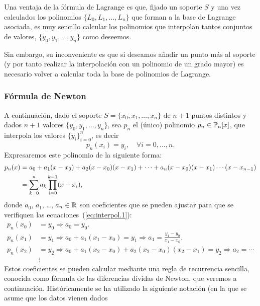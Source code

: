 \begin{remark}
  Una ventaja de la fórmula de Lagrange es que, fijado un soporte $S$
  y una vez calculados los polinomios $\{L_0,L_1,\dots, L_n\}$ que
  forman a la base de Lagrange asociada, es muy sencillo calcular los
  polinomios que interpolan tantos conjuntos de valores,
  $\{y_0,y_1,\dots,y_n\}$ como deseemos. 
  
  Sin embargo, su inconveniente es que si deseamos añadir un punto más
  al soporte (y por tanto realizar la interpolación con un polinomio
  de un grado mayor) es necesario volver a calcular toda la base de
  polinomios de Lagrange.
\end{remark}

\subsubsection{Fórmula de Newton}
\label{sec:formula-de-newton}
A continuación, dado el soporte $S=\{x_0,x_1,\dots,x_n\}$ de $n+1$ puntos
distintos y dados $n+1$ valores $\{y_0,y_1,\dots,y_n\}$, sea
$p_n$ el (único) polinomio $p_n \in \operatorname{{\mathbb P}}_n[x]$, que
interpola los valores $\{y_i\}_{i=0}^n$, es decir
\begin{equation}
p_n(x_i)=y_i, \quad \forall i=0,...,n.
\label{eq:interpol.1}
\end{equation}
Expresaremos este polinomio de la siguiente forma:
\begin{align}
  \notag
  p_n(x)&=a_0 + a_1 (x-x_0) + a_2(x-x_0)(x-x_1) + \cdots 
  + a_n(x-x_0)(x-x_1)\cdots(x-x_{n-1}) \\
  &=\sum_{k=0}^n a_k \prod_{i=0}^{k-1}(x-x_i),
\label{eq:pol.newton.dif-div}
\end{align}
donde $a_0$, $a_1$, \dots, $a_n\in\operatorname{{\mathbb R}}$ son coeficientes que se
pueden ajustar para que se verifiquen las
ecuaciones~(\ref{eq:interpol.1}):
\begin{align*}
  p_n(x_0)&=y_0 \Rightarrow a_0=y_0.\\
  p_n(x_1)&=y_1 \Rightarrow a_0+a_1(x_1-x_0)=y_1 
  \Rightarrow a_1=\frac{y_1-y_0}{x_1-x_0}.\\
  p_n(x_2)&=y_2 \Rightarrow a_0+a_1(x_2-x_0)+a_2(x_2-x_0)(x_2-x_1)=y_2 
  \Rightarrow a_2=\cdots\\
  &\vdots
\end{align*}
Estos coeficientes se pueden calcular mediante una regla de
recurrencia sencilla, conocida como fórmula de las diferencias dividas
de Newton, que veremos a continuación. Históricamente se ha utilizado
la siguiente notación (en la que se asume que los datos vienen dados

